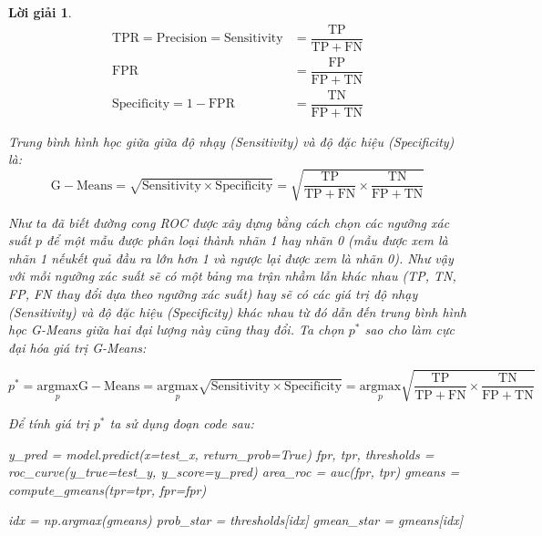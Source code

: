 \documentclass[14pt, a4paper]{article}
\theoremstyle{sltheorem}
\theoremstyle{soltheorem}
\newtheorem*{loigiai}{Lời giải}
\begin{document}
\begin{loigiai}
    \begin{equation*}
        \begin{aligned}
            \mathrm{TPR} = \mathrm{Precision} = \mathrm{Sensitivity} &= \dfrac{\mathrm{TP}}{\mathrm{TP} + \mathrm{FN}} \\
            \mathrm{FPR} &= \dfrac{\mathrm{FP}}{\mathrm{FP} + \mathrm{TN}} \\
            \mathrm{Specificity} = 1 - \mathrm{FPR} &= \dfrac{\mathrm{TN}}{\mathrm{FP} + \mathrm{TN}}
        \end{aligned}
    \end{equation*}

    Trung bình hình học giữa giữa độ nhạy (Sensitivity) và độ đặc hiệu (Specificity) là:
    \begin{equation*}
        \mathrm{G-Means} = \sqrt{\mathrm{Sensitivity} \times \mathrm{Specificity}} = \sqrt{\dfrac{\mathrm{TP}}{\mathrm{TP} + \mathrm{FN}} \times \dfrac{\mathrm{TN}}{\mathrm{FP} + \mathrm{TN}}}
    \end{equation*}

    Như ta đã biết đường cong ROC được xây dựng bằng cách chọn các ngưỡng xác suất $p$ để một mẫu được phân loại thành nhãn 1 hay nhãn 0 (mẫu được xem là nhãn 1 nếukết quả đầu ra lớn hơn 1 và ngược lại được xem là nhãn 0).
    Như vậy với mỗi ngưỡng xác suất sẽ có một bảng ma trận nhầm lẫn khác nhau (TP, TN, FP, FN thay đổi dựa theo ngưỡng xác suất) hay sẽ có các giá trị độ nhạy (Sensitivity) và độ đặc hiệu (Specificity) khác nhau từ đó dẫn đến trung bình hình học G-Means giữa hai đại lượng này cũng thay đổi.
    Ta chọn $p^*$ sao cho làm cực đại hóa giá trị G-Means:

    \begin{equation*}
        p^* = \underset{p}{\mathrm{argmax}} \mathrm{G-Means} = \underset{p}{\mathrm{argmax}} \sqrt{\mathrm{Sensitivity} \times \mathrm{Specificity}} = \underset{p}{\mathrm{argmax}} \sqrt{\dfrac{\mathrm{TP}}{\mathrm{TP} + \mathrm{FN}} \times \dfrac{\mathrm{TN}}{\mathrm{FP} + \mathrm{TN}}}
    \end{equation*}

    Để tính giá trị $p^*$ ta sử dụng đoạn code sau:

    \begin{python}
y_pred = model.predict(x=test_x, return_prob=True)
fpr, tpr, thresholds = roc_curve(y_true=test_y, y_score=y_pred)
area_roc = auc(fpr, tpr)
gmeans = compute_gmeans(tpr=tpr, fpr=fpr)
        
idx = np.argmax(gmeans)
prob_star = thresholds[idx]
gmean_star = gmeans[idx]
    \end{python}


\end{loigiai}
\end{document}
